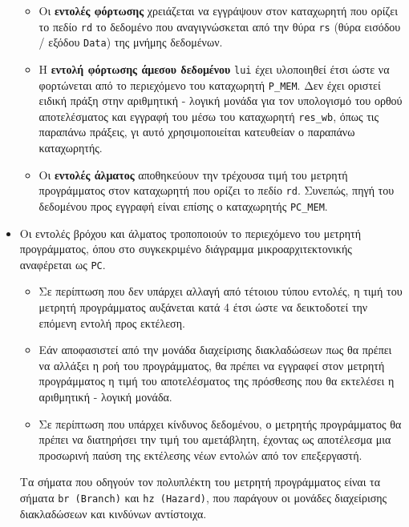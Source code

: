 \documentclass[11pt]{extarticle}
\begin{document}
\begin{itemize}
\begin{itemize}
        \item Οι \textbf{εντολές φόρτωσης} χρειάζεται να εγγράψουν στον καταχωρητή που ορίζει το πεδίο \texttt{rd} το δεδομένο που αναγιγνώσκεται από την θύρα \texttt{rs} (θύρα εισόδου / εξόδου \texttt{Data}) της μνήμης δεδομένων.
        \item Η \textbf{εντολή φόρτωσης άμεσου δεδομένου} \texttt{lui} έχει υλοποιηθεί έτσι ώστε να φορτώνεται από το περιεχόμενο του καταχωρητή \texttt{P\_MEM}.
        Δεν έχει οριστεί ειδική πράξη στην αριθμητική - λογική μονάδα για τον υπολογισμό του ορθού αποτελέσματος και εγγραφή του μέσω του καταχωρητή \texttt{res\_wb}, όπως τις παραπάνω πράξεις, γι αυτό χρησιμοποιείται κατευθείαν ο παραπάνω καταχωρητής.
        \item Οι \textbf{εντολές άλματος} αποθηκεύουν την τρέχουσα τιμή του μετρητή προγράμματος στον καταχωρητή που ορίζει το πεδίο \texttt{rd}.
        Συνεπώς, πηγή του δεδομένου προς εγγραφή είναι επίσης ο καταχωρητής \texttt{PC\_MEM}.
    \end{itemize}
    \item Οι εντολές βρόχου και άλματος τροποποιούν το περιεχόμενο του μετρητή προγράμματος, όπου στο συγκεκριμένο διάγραμμα μικροαρχιτεκτονικής αναφέρεται ως \texttt{PC}.
    \begin{itemize}
        \item Σε περίπτωση που δεν υπάρχει αλλαγή από τέτοιου τύπου εντολές, η τιμή του μετρητή προγράμματος αυξάνεται κατά 4 έτσι ώστε να δεικτοδοτεί την επόμενη εντολή προς εκτέλεση.
        \item Εάν αποφασιστεί από την μονάδα διαχείρισης διακλαδώσεων πως θα πρέπει να αλλάξει η ροή του προγράμματος, θα πρέπει να εγγραφεί στον μετρητή προγράμματος η τιμή του αποτελέσματος της πρόσθεσης που θα εκτελέσει η αριθμητική - λογική μονάδα.
        \item Σε περίπτωση που υπάρχει κίνδυνος δεδομένου, ο μετρητής προγράμματος θα πρέπει να διατηρήσει την τιμή του αμετάβλητη, έχοντας ως αποτέλεσμα μια προσωρινή παύση της εκτέλεσης νέων εντολών από τον επεξεργαστή.
    \end{itemize}
    Τα σήματα που οδηγούν τον πολυπλέκτη του μετρητή προγράμματος είναι τα σήματα \texttt{br (Branch)} και \texttt{hz (Hazard)}, που παράγουν οι μονάδες διαχείρισης διακλαδώσεων και κινδύνων αντίστοιχα.
\end{itemize}
\end{document}

